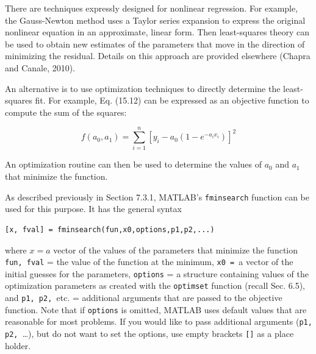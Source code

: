 \documentclass[../main.tex]{subfiles}
\begin{document}
There are techniques expressly designed for nonlinear regression. For example, the
Gauss-Newton method uses a Taylor series expansion to express the original nonlinear
equation in an approximate, linear form. Then least-squares theory can be used to obtain
new estimates of the parameters that move in the direction of minimizing the residual.
Details on this approach are provided elsewhere (Chapra and Canale, 2010).

An alternative is to use optimization techniques to directly determine the least-squares
fit. For example, Eq. (15.12) can be expressed as an objective function to compute the sum
of the squares:

\begin{equation}
	\tag{15.13}
	f(a_0, a_1) = \sum^n_{i=1} {[y_i - a_0 (1 - e ^ {-a_i x_i})]} ^ 2
\end{equation}

An optimization routine can then be used to determine the values of $a_0$ and $a_1$ that minimize the function.

As described previously in Section 7.3.1, MATLAB's \texttt{fminsearch} function can be used for this purpose. It has the general syntax

\begin{lstlisting}[numbers=none] 
	[x, fval] = fminsearch(fun,x0,options,p1,p2,...)
\end{lstlisting}

\noindent where $x = a$ vector of the values of the parameters that minimize the function \texttt{fun, fval} = the value of the function at the minimum, \texttt{x0 = }a vector of the initial guesses for the parameters, \texttt{options} = a structure containing values of the optimization parameters as created with the \texttt{optimset} function (recall Sec. 6.5), and \texttt{p1, p2, }etc. = additional arguments that are passed to the objective function. 
Note that if \texttt{options} is omitted, MATLAB uses default values that are reasonable for most problems. If you would like to pass additional arguments (\texttt{p1, p2, }\dots), but do not want to set the options, use empty brackets \texttt{[]} as a place holder.
\end{document}
